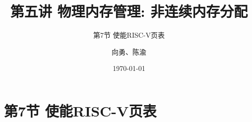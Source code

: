 


\title[第5讲]{第五讲 物理内存管理: 非连续内存分配} %
\subtitle{第7节 使能RISC-V页表}
\author{向勇、陈渝} %
\date{\today} %



\begin{frame}
\titlepage %
\end{frame}


\section{第7节 使能RISC-V页表}%




